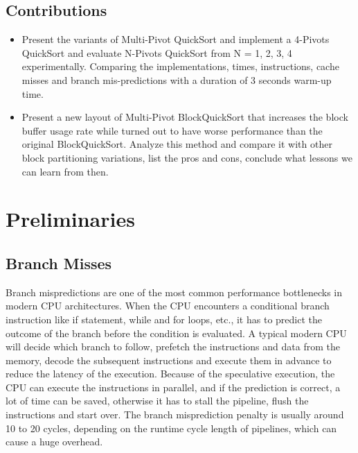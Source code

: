 \documentclass[a4paper,oneside,12pt]{book}
\begin{document}
\clearpage
\subsection{Contributions}
\begin{itemize}
    \item Present the variants of Multi-Pivot QuickSort and implement a 4-Pivots QuickSort and evaluate N-Pivots QuickSort from N = 1, 2, 3, 4 experimentally. 
        Comparing the implementations, times, instructions, cache misses and branch mis-predictions with a duration of 3 seconds warm-up time.
    \item Present a new layout of Multi-Pivot BlockQuickSort that increases the block buffer usage rate while turned out to have worse performance than the original BlockQuickSort. 
        Analyze this method and compare it with other block partitioning variations, list the pros and cons, conclude what lessons we can learn from then.
\end{itemize}

\section{Preliminaries}

\subsection{Branch Misses}
Branch mispredictions are one of the most common performance bottlenecks in modern CPU architectures. 
When the CPU encounters a conditional branch instruction like if statement, while and for loops, etc., it has to predict the outcome of the branch before the condition is evaluated.
A typical modern CPU will decide which branch to follow, prefetch the instructions and data from the memory, decode the subsequent instructions and execute them in advance to reduce the latency of the execution.
Because of the speculative execution, the CPU can execute the instructions in parallel, and if the prediction is correct, a lot of time can be saved, otherwise it has to stall the pipeline, flush the instructions and start over.
The branch misprediction penalty is usually around 10 to 20 cycles, depending on the runtime cycle length of pipelines, which can cause a huge overhead.
\end{document}
